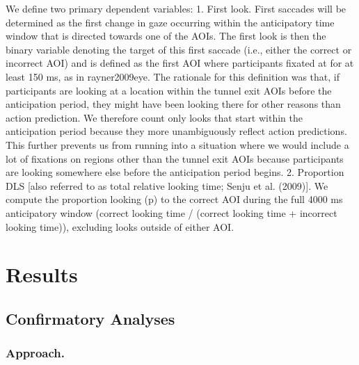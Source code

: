 \documentclass[
  english,
  man,floatsintext]{apa6}
\begin{document}
We define two primary dependent variables:
1. First look. First saccades will be determined as the first change in gaze occurring within the anticipatory time window that is directed towards one of the AOIs. The first look is then the binary variable denoting the target of this first saccade (i.e., either the correct or incorrect AOI) and is defined as the first AOI where participants fixated at for at least 150 ms, as in rayner2009eye. The rationale for this definition was that, if participants are looking at a location within the tunnel exit AOIs before the anticipation period, they might have been looking there for other reasons than action prediction. We therefore count only looks that start within the anticipation period because they more unambiguously reflect action predictions. This further prevents us from running into a situation where we would include a lot of fixations on regions other than the tunnel exit AOIs because participants are looking somewhere else before the anticipation period begins.
2. Proportion DLS {[}also referred to as total relative looking time; Senju et al. (2009){]}. We compute the proportion looking (p) to the correct AOI during the full 4000 ms anticipatory window (correct looking time / (correct looking time + incorrect looking time)), excluding looks outside of either AOI.

\hypertarget{results}{%
\section{Results}\label{results}}

\hypertarget{confirmatory-analyses}{%
\subsection{Confirmatory Analyses}\label{confirmatory-analyses}}

\hypertarget{approach.}{%
\subsubsection{Approach.}\label{approach.}}
\end{document}
